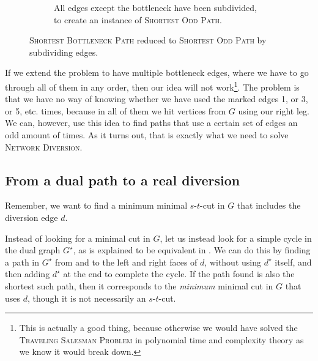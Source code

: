 \begin{figure}[h]
\begin{subfigure}{.80\textwidth}
        \caption{All edges except the bottleneck have been subdivided, to create an instance of \textsc{Shortest Odd Path}.}
        \label{figure:subdivided-bottleneck}
    \end{subfigure}%
    \caption{\textsc{Shortest Bottleneck Path} reduced to \textsc{Shortest Odd Path} by subdividing edges.}
    \label{figure:bottleneck-subdividing}
\end{figure}

If we extend the problem to have multiple bottleneck edges, where we have to go through all of them in any order, then our idea will not work\footnote{This is actually a good thing, because otherwise we would have solved the \textsc{Traveling Salesman Problem} in polynomial time and complexity theory as we know it would break down.}.
The problem is that we have no way of knowing whether we have used the marked edges 1, or 3, or 5, etc. times, because in all of them we hit vertices from $G$ using our right leg. We can, however, use this idea to find paths that use a certain set of edges an odd amount of times. As it turns out, that is exactly what we need to solve \textsc{Network Diversion}.

\subsection{From a dual path to a real diversion}
Remember, we want to find a minimum minimal $s$-$t$-cut in $G$ that includes the diversion edge $d$.

Instead of looking for a minimal cut in $G$, let us instead look for a simple cycle in the dual graph $G^\star$, as is explained to be equivalent in . We can do this by finding a path in $G^\star$ from and to the left and right faces of $d$, without using $d^\star$ itself, and then adding $d^\star$ at the end to complete the cycle. If the path found is also the shortest such path, then it corresponds to the \emph{minimum} minimal cut in $G$ that uses $d$, though it is not necessarily an $s$-$t$-cut.

